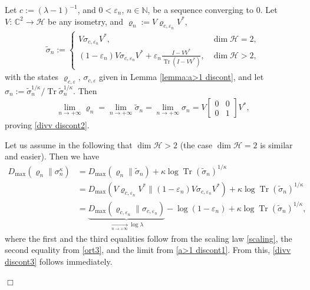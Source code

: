 \documentclass[unsortedaddress,superscriptaddress,pra,notitlepage]{revtex4}
\newenvironment{proof}[1][Proof]{\begin{trivlist}
\item[\hskip \labelsep {\bfseries #1}]}{\hfill$\Box$\end{trivlist}}
\newcommand{\nn}{\nonumber \\}
\def\bN{\mathbb{N}}
\def\bC{\mathbb{C}}
\def\ep{\varepsilon}
\def\rho{\varrho}
\def\hil{{\mathcal H}}
\def\bz{\left(}
\def\jz{\right)}
\def\inv{^{-1}}
\def\nn{\nonumber}
\def\pwr{\kappa}
\DeclareMathOperator{\Tr}{Tr}
\begin{document}
\begin{proof}
Let $c:=(\lambda-1)\inv$, and $0<\ep_n$, $n\in\bN$, be a sequence converging to $0$. 
Let $V:\,\bC^2\to\hil$ be any isometry, and $\rho_n:=V\rho_{c,\ep_n}V^*$, 
\begin{align*}
\tilde\sigma_n:=
\begin{cases}
V\sigma_{c,\ep_n}V^*,&\dim\hil=2,\\
(1-\ep_n)V\sigma_{c,\ep_n}V^*+\ep_n\frac{I-VV^*}{\Tr(I-VV^*)},&\dim\hil>2,
\end{cases}
\end{align*}
with the states $\rho_{c,\ep}$, $\sigma_{c,\ep}$ given in 
Lemma \ref{lemma:a>1 discont}, and let 
$\sigma_n:=\tilde\sigma_n^{1/\pwr}/\Tr\tilde\sigma_n^{1/\pwr}$.
Then 
\begin{align*}
\lim_{n\to+\infty}\rho_n=
\lim_{n\to+\infty}\tilde\sigma_n=
\lim_{n\to+\infty}\sigma_n=
V\begin{bmatrix}0 & 0 \\ 0 & 1\end{bmatrix}V^*,
\end{align*}
proving \eqref{divv discont2}.

Let us assume in the following that $\dim\hil>2$ (the case $\dim\hil=2$ is similar and easier). Then
we have
\begin{align}
D_{\max}\bz\rho_n\|\sigma_n^{\pwr}\jz
&=
D_{\max}\bz\rho_n\|\tilde\sigma_n\jz+\pwr\log\Tr(\tilde\sigma_n)^{1/\pwr}\nn\\
&=
D_{\max}\bz V\rho_{c,\ep_n}V^*\|(1-\ep_n)V\sigma_{c,\ep_n}V^*\jz+
\pwr\log\Tr(\tilde\sigma_n)^{1/\pwr}\nn\\
&=
\underbrace{D_{\max}\bz \rho_{c,\ep_n}\|\sigma_{c,\ep_n}\jz}_{
\xrightarrow[n\to+\infty]{}\log\lambda}-\log(1-\ep_n)+
\pwr\log\Tr(\tilde\sigma_n)^{1/\pwr},\label{divv discont proof1}
\end{align}
where the first and the third equalities follow from the scaling law \eqref{scaling},
the second equality from \eqref{ort3},
and the limit from \eqref{a>1 discont1}. From this, \eqref{divv discont3} follows immediately. 


\end{proof}
\end{document}
